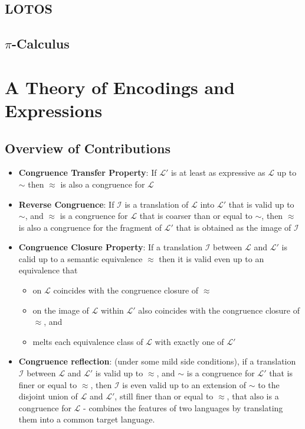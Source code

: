 \documentclass{article}
\begin{document}
\subsection{LOTOS}
\subsection{\texorpdfstring{$\pi$}{pi}-Calculus}

\newpage
\section{A Theory of Encodings and Expressions}

\subsection{Overview of Contributions}
\begin{itemize}
    \item \textbf{Congruence Transfer Property}: If $\mathcal{L}'$ is at least as expressive as $\mathcal{L}$ up to $\sim$ then $\approx$ is also a congruence for $\mathcal{L}$
    \item \textbf{Reverse Congruence}: If $\mathcal{I}$ is a translation of $\mathcal{L}$ into $\mathcal{L}'$ that is valid up to $\sim$, and $\approx$ is a congruence for $\mathcal{L}$ that is coarser than or equal to $\sim$, then $\approx$ is also a congruence for the fragment of $\mathcal{L}'$ that is obtained as the image of $\mathcal{I}$
    \item \textbf{Congruence Closure Property}: If a translation $\mathcal{I}$ between $\mathcal{L}$ and $\mathcal{L}'$ is calid up to a semantic equivalence $\approx$ then it is valid even up to an equivalence that
        \begin{itemize}
            \item on $\mathcal{L}$ coincides with the congruence closure of $\approx$
            \item on the image of $\mathcal{L}$ within $\mathcal{L}'$ also coincides with the congruence closure of $\approx$, and
            \item melts each equivalence class of $\mathcal{L}$ with exactly one of $\mathcal{L}'$
        \end{itemize}
    \item \textbf{Congruence reflection}: (under some mild side conditions), if a translation $\mathcal{I}$ between $\mathcal{L}$ and $\mathcal{L}'$ is valid up to $\approx$, and $\sim$ is a congruence for $\mathcal{L}'$ that is finer or equal to $\approx$, then $\mathcal{I}$ is even valid up to an extension of $\sim$ to the disjoint union of $\mathcal{L}$ and $\mathcal{L}'$, still finer than or equal to $\approx$, that also is a congruence for $\mathcal{L}$ - combines the features of two languages by translating them into a common target language.
\end{itemize}
\end{document}
